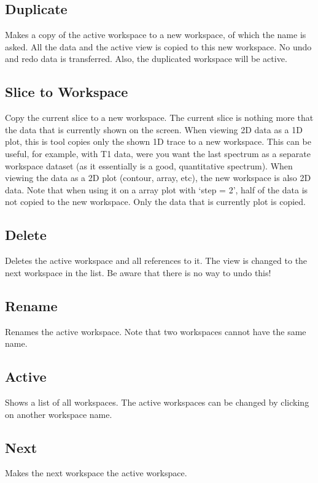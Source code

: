 \documentclass[11pt,a4paper]{article}
\begin{document}
\subsection{Duplicate}
Makes a copy of the active workspace to a new workspace, of which the name is asked. All the data and the active view is copied to this new workspace. No undo and redo data is transferred. Also, the duplicated workspace will be active.


\subsection{Slice to Workspace}
Copy the current slice to a new workspace. The current slice is nothing more that the data that is
currently shown on the screen. When viewing 2D data as a 1D plot, this is tool copies only the shown
1D trace to a new workspace. This can be useful, for example, with T1 data, were you want the last
spectrum as a separate workspace dataset (as it essentially is a good, quantitative spectrum). When
viewing the data as a 2D plot (contour, array, etc), the new workspace is also 2D data. Note that
when using it on a array plot with `step = 2', half of the data is not copied to the new workspace.
Only the data that is currently plot is copied.


\subsection{Delete}
Deletes the active workspace and all references to it. The view is changed to the next workspace in the list. Be aware that there is no way to undo this!

\subsection{Rename}
Renames the active workspace. Note that two workspaces cannot have the same name.

\subsection{Active}
Shows a list of all workspaces. The active workspaces can be changed by clicking on another workspace name.

\subsection{Next}
Makes the next workspace the active workspace.
\end{document}

